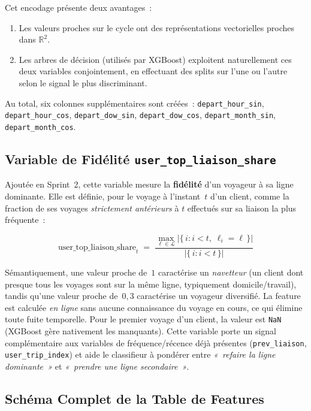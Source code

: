 \documentclass[11pt, a4paper]{article}
\begin{document}
Cet encodage présente deux avantages~:
\begin{enumerate}
\item Les valeurs proches sur le cycle ont des représentations
    vectorielles proches dans $\mathbb{R}^2$.
\item Les arbres de décision (utilisés par XGBoost) exploitent
    naturellement ces deux variables conjointement, en effectuant des
    splits sur l'une ou l'autre selon le signal le plus discriminant.
\end{enumerate}

Au total, six colonnes supplémentaires sont créées~:
\texttt{depart\_hour\_sin}, \texttt{depart\_hour\_cos},
\texttt{depart\_dow\_sin}, \texttt{depart\_dow\_cos},
\texttt{depart\_month\_sin}, \texttt{depart\_month\_cos}.

\subsection{Variable de Fidélité \texttt{user\_top\_liaison\_share}}

Ajoutée en Sprint~2, cette variable mesure la \textbf{fidélité} d'un
voyageur à sa ligne dominante. Elle est définie, pour le voyage à
l'instant~$t$ d'un client, comme la fraction de ses voyages
\textit{strictement antérieurs} à $t$ effectués sur sa liaison la
plus fréquente~:

\[
\text{user\_top\_liaison\_share}_t \;=\;
   \frac{\max_{\ell \in \mathcal{L}} \big|\{\,i : i < t,\; \ell_i = \ell \,\}\big|}
        {\big|\{\,i : i < t \,\}\big|}
\]

Sémantiquement, une valeur proche de~$1$ caractérise un
\textit{navetteur} (un client dont presque tous les voyages sont sur
la même ligne, typiquement domicile/travail), tandis qu'une valeur
proche de~$0{,}3$ caractérise un voyageur diversifié.
La feature est calculée \textit{en ligne} sans aucune connaissance
du voyage en cours, ce qui élimine toute fuite temporelle. Pour le
premier voyage d'un client, la valeur est \texttt{NaN} (XGBoost gère
nativement les manquants). Cette variable porte un signal complémentaire
aux variables de fréquence/récence déjà présentes (\texttt{prev\_liaison},
\texttt{user\_trip\_index}) et aide le classifieur à pondérer entre
\textit{«~refaire la ligne dominante~»} et \textit{«~prendre une ligne
secondaire~»}.

\subsection{Schéma Complet de la Table de Features}
\end{document}
